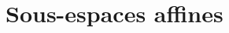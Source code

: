 \documentclass[../main.tex]{subfiles}
\begin{document}
\setcounter{chapter}{22}
\chapter{Sous-espaces affines}
\tableofcontents
\clearpage
\end{document}

